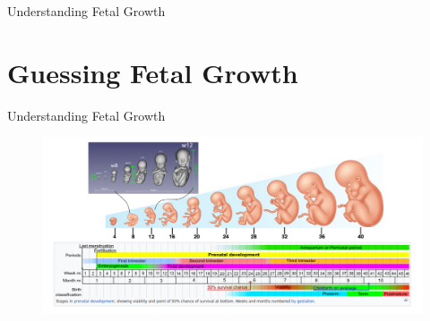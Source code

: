 

{
\begin{frame}{}

\BigSizeFont
Understanding Fetal Growth
\end{frame}
}




\section{Guessing Fetal Growth}



{
\begin{frame}{Understanding Fetal Growth}
      \begin{figure}
        \centering
        \includegraphics[width=1.0\textwidth]{./../figures/fetal-growth/versions/drawing-v02.png}
      \end{figure}
\end{frame}
}





